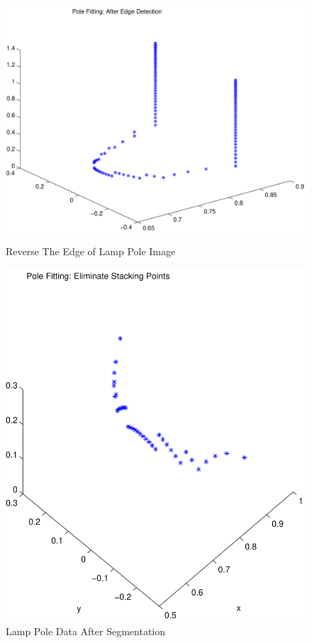 \documentclass{cdcarta4}
\begin{document}
\begin{figure}[!htb]
    \begin{minipage}[t]{0.24\textwidth}
        \centering\includegraphics[width=\textwidth]{img/PoleFitAfterEdgeDet}
        \caption{Reverse The Edge of Lamp Pole Image} \label{fig:polefitafteredgedet}
    \end{minipage}%
    \begin{minipage}[t]{0.24\textwidth}
        \center\includegraphics[width=\textwidth]{img/PoleFitEliminateStacks} 
        \caption{Lamp Pole Data After Segmentation} \label{fig:polefitElm}
    \end{minipage}
\end{figure}
\end{document}
